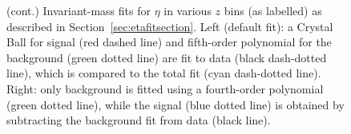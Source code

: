 \begin{figure}[H]  
 \centering 
\label{fig:etazfit}
\caption[Invariant-mass fits for $\eta$ in various \(z\) bins (cont.)]{(cont.) Invariant-mass fits for $\eta$ in various \(z\) bins (as labelled) as described in Section~\ref{sec:etafitsection}. Left (default fit):  a Crystal Ball for signal (red dashed line) and fifth-order polynomial for the background (green dotted line) are fit to data (black dash-dotted line), which is compared to the total fit  (cyan dash-dotted line). Right: only background is fitted using a fourth-order polynomial (green dotted line), while the signal (blue dotted line) is obtained by subtracting the background fit from data (black line).}
\end{figure}


